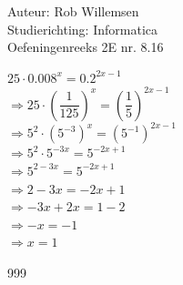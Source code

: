 \documentclass[a4paper]{article}
\begin{document}
\noindent \large Auteur: Rob Willemsen \\
\noindent \large Studierichting: Informatica\\
\noindent \large Oefeningenreeks 2E nr. 8.16\\

\medskip

\normalsize

$25 \cdot 0.008^x = 0.2^{2x-1}$\\

$\Rightarrow 25 \cdot \left(\dfrac{1}{125}\right)^x = \left(\dfrac{1}{5}\right)^{2x-1}$\\

$\Rightarrow 5^2 \cdot (5^{-3})^x = (5^{-1})^{2x-1}$\\

$\Rightarrow 5^2 \cdot 5^{-3x} = 5^{-2x+1}$\\

$\Rightarrow 5^{2-3x} = 5^{-2x+1}$\\

$\Rightarrow 2 - 3x = -2x + 1$\\

$\Rightarrow -3x + 2x = 1 - 2$\\

$\Rightarrow -x = -1$\\

$\Rightarrow x = 1$\\

\begin{thebibliography}{999}
\end{thebibliography}
\end{document}

